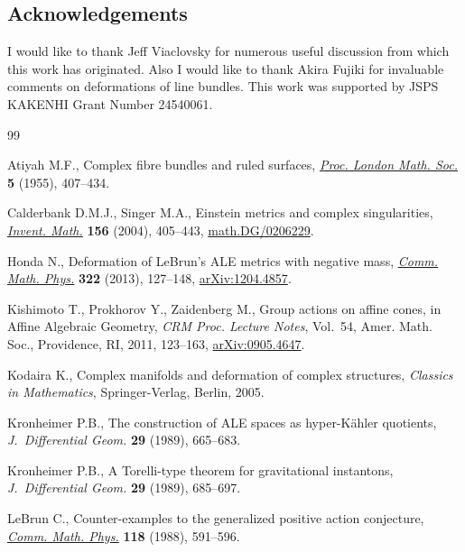 \documentclass[pdftex]{sigma}
\numberwithin{equation}{section}
\begin{document}
\subsection*{Acknowledgements}

I would like to thank Jef\/f Viaclovsky for numerous useful discussion from which this work has originated.
Also I would like to thank Akira Fujiki for invaluable comments on deformations of line bundles.
This work was supported by JSPS KAKENHI Grant Number 24540061.

\begin{thebibliography}{99}
\footnotesize\itemsep=0pt

Atiyah M.F., Complex f\/ibre bundles and ruled surfaces, \href{http://dx.doi.org/10.1112/plms/s3-5.4.407}{\textit{Proc. London
  Math. Soc.}} \textbf{5} (1955), 407--434.

Calderbank D.M.J., Singer M.A., Einstein metrics and complex singularities,
  \href{http://dx.doi.org/10.1007/s00222-003-0344-1}{\textit{Invent. Math.}} \textbf{156} (2004), 405--443,
  \href{http://arxiv.org/abs/math.DG/0206229}{math.DG/0206229}.

Honda N., Deformation of {L}e{B}run's {ALE} metrics with negative mass,
  \href{http://dx.doi.org/10.1007/s00220-012-1656-z}{\textit{Comm. Math. Phys.}} \textbf{322} (2013), 127--148, \href{http://arxiv.org/abs/1204.4857}{arXiv:1204.4857}.

Kishimoto T., Prokhorov Y., Zaidenberg M., Group actions on af\/f\/ine cones, in
  Af\/f\/ine Algebraic Geometry, \textit{CRM Proc. Lecture Notes}, Vol.~54, Amer.
  Math. Soc., Providence, RI, 2011, 123--163, \href{http://arxiv.org/abs/0905.4647}{arXiv:0905.4647}.

Kodaira K., Complex manifolds and deformation of complex structures, \textit{Classics
  in Mathematics}, Springer-Verlag, Berlin, 2005.

Kronheimer P.B., The construction of {ALE} spaces as hyper-{K}\"ahler
  quotients, \textit{J.~Differential Geom.} \textbf{29} (1989), 665--683.

Kronheimer P.B., A {T}orelli-type theorem for gravitational instantons,
  \textit{J.~Differential Geom.} \textbf{29} (1989), 685--697.

LeBrun C., Counter-examples to the generalized positive action conjecture,
  \href{http://dx.doi.org/10.1007/BF01221110}{\textit{Comm. Math. Phys.}} \textbf{118} (1988), 591--596.


\end{thebibliography}
\end{document}
